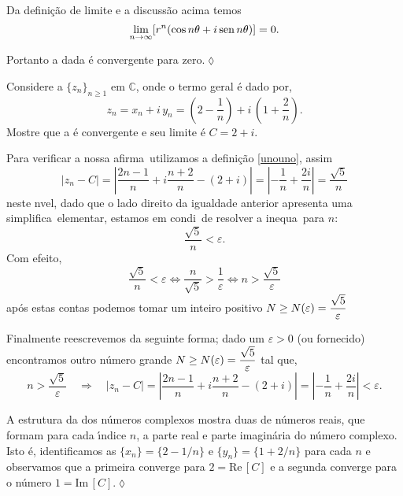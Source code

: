 Da defini\c{c}\~{a}o de limite e a discuss\~{a}o acima temos
\begin{equation*}
  \lim_{n\to\infty}[r^n(\cos n\theta+i\operatorname{sen} n\theta)]=0.
\end{equation*}

Portanto a \seq dada \'{e} convergente para zero.\hfill \(\lozenge\)

\begin{exer}
  Considere a \seq $\{z_n\}_{n\geq 1}$ em $\mathbb{C}$, onde o termo geral \'{e} dado por,
  \begin{equation*}
  z_n=x_n+i\,y_n=\left(2-\frac{1}{n}\right)+i\,\left(1+\frac{2}{n}\right).
  \end{equation*}
Mostre que a \seq \'{e} convergente e seu limite \'{e} $C=2+i$.
\end{exer}

\solo Para verificar a nossa afirma\cao\
  utilizamos a defini\c{c}\~{a}o \eqref{unouno}, assim
\begin{equation*}
  |z_n-C|=\left|\frac{2n-1}{n}+i\frac{n+2}{n}-(2+i)\right|=\left|-\frac{1}{n}+ \frac{2i}{n}\right|=\frac{\sqrt{5}}{n}
\end{equation*}
neste n\ii vel, dado que o lado direito da igualdade anterior apresenta uma simplifica\cao\ elementar, estamos em condi\coes\ de
resolver a inequa\cao\ para $n$:
\begin{equation*}
  \frac{\sqrt{5}}{n}<\varepsilon.
\end{equation*}
Com efeito,
\begin{equation*}
   \frac{\sqrt{5}}{n}<\varepsilon \Leftrightarrow
   \frac{n}{\sqrt{5}}>\frac{1}{\varepsilon}\Leftrightarrow n >\frac{\sqrt{5}}{\varepsilon}
\end{equation*}
ap\'os estas contas podemos tomar um inteiro positivo  $N \geq N(\varepsilon)=\displaystyle{\frac{\sqrt{5}}{\varepsilon}}$

Finalmente reescrevemos da seguinte forma;
dado um $\varepsilon>0$ (ou fornecido) encontramos  outro n\'{u}mero
grande $N\geq N(\varepsilon)=\displaystyle{\frac{\sqrt{5}}{\varepsilon}}$ tal que,
\begin{equation*}
n>\frac{\sqrt{5}}{\varepsilon}\quad\Longrightarrow\quad
|z_n-C|=\left|\frac{2n-1}{n}+i\frac{n+2}{n}-(2+i)\right|=\left|-\frac{1}{n}+
  \frac{2i}{n}\right|<\varepsilon.
\end{equation*}

A estrutura da \seq dos n\'umeros complexos mostra duas \seqs de
n\'umeros reais, que formam para cada \'{\i}ndice $n$, a parte real e
parte imagin\'aria do n\'umero complexo. Isto \'e, identificamos as
\seqs $\{x_n\}=\{2-1/n\}$ e $\{y_n\}=\{1+2/n\}$ para cada $n$ e
observamos que a primeira converge para $2=\textrm{Re}\,[C]$ e a segunda
converge para o n\'{u}mero $1=\textrm{Im}\,[C]$.\hfill \(\lozenge\)

